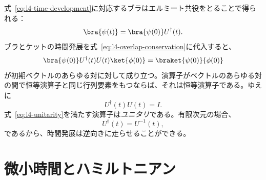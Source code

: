 式~\eqref{eq:l4-time-development}に対応するブラはエルミート共役をとることで得られる：
\begin{equation}
\bra{\psi(t)}=\bra{\psi(0)}U^\dagger(t).
\end{equation}
ブラとケットの時間発展を式~\eqref{eq:l4-overlap-conservation}に代入すると、
\begin{equation}
\bra{\psi(0)}U^\dagger(t)U(t)\ket{\phi(0)}
=
\braket{\psi(0)}{\phi(0)}
\end{equation}
が初期ベクトルのあらゆる対に対して成り立つ。演算子がベクトルのあらゆる対の間で恒等演算子と同じ行列要素をもつならば、それは恒等演算子である。ゆえに
\begin{equation}
U^\dagger(t)U(t)=I.
\label{eq:l4-unitarity}
\end{equation}
式~\eqref{eq:l4-unitarity}を満たす演算子は\emph{ユニタリ}である。有限次元の場合、
\begin{equation}
U^\dagger(t)=U^{-1}(t),
\end{equation}
であるから、時間発展は逆向きに走らせることができる。

\begin{classroomqa}
\end{classroomqa}

\begin{classroomqa}
\end{classroomqa}

\section{微小時間とハミルトニアン}

